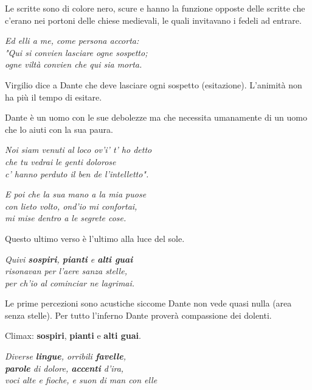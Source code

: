 \documentclass[a4paper]{article}
\begin{document}
Le scritte sono di colore nero, scure e hanno la funzione opposte delle scritte
che c'erano nei portoni delle chiese medievali, le quali invitavano i fedeli ad entrare.

\begin{center}
    \textit{Ed elli a me, come persona accorta:} \\
    \textit{"Qui si convien lasciare ogne sospetto;} \\
    \textit{ogne viltà convien che qui sia morta.}
\end{center}

Virgilio dice a Dante che deve lasciare ogni sospetto (esitazione).
L'animità non ha più il tempo di esitare.

Dante è un uomo con le sue debolezze ma che necessita umanamente di un uomo che lo aiuti con la sua paura.

\begin{center}
    \textit{Noi siam venuti al loco ov'i' t' ho detto} \\
    \textit{che tu vedrai le genti dolorose} \\
    \textit{c' hanno perduto il ben de l'intelletto". }
\end{center}

\begin{center}
    \textit{E poi che la sua mano a la mia puose} \\
    \textit{con lieto volto, ond'io mi confortai,} \\
    \textit{mi mise dentro a le segrete cose. }
\end{center}

Questo ultimo verso è l'ultimo alla luce del sole.

\begin{center}
    \textit{Quivi \textbf{sospiri}, \textbf{pianti} e \textbf{alti guai}} \\
    \textit{risonavan per l'aere sanza stelle,} \\
    \textit{per ch'io al cominciar ne lagrimai. }
\end{center}

Le prime percezioni sono acustiche siccome Dante non vede quasi nulla (area senza stelle).
Per tutto l'inferno Dante proverà compassione dei dolenti.

Climax: \textbf{sospiri}, \textbf{pianti} e \textbf{alti guai}.

\begin{center}
    \textit{Diverse \textbf{lingue}, orribili \textbf{favelle},} \\
    \textit{\textbf{parole} di dolore, \textbf{accenti} d'ira,} \\
    \textit{voci alte e fioche, e suon di man con elle }
\end{center}
\end{document}
